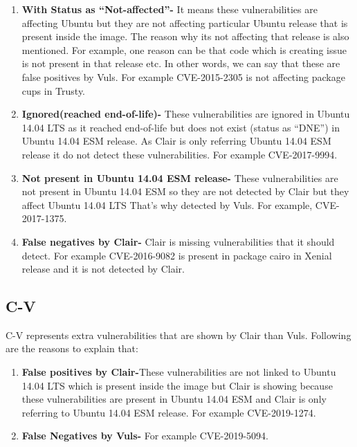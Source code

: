 \documentclass[a4paper,num-refs]{oup-contemporary}
\begin{document}
\begin{enumerate}

\item\textbf{With Status as “Not-affected”-} It means these vulnerabilities are affecting Ubuntu but they are not 
affecting particular Ubuntu release that is present inside the image. The reason why its not affecting 
that release is also mentioned. For example, one reason can be that code which is creating issue is not 
present in that release etc. In other words, we can say that these are false positives by Vuls.
For example CVE-2015-2305 is not affecting package cups in Trusty.

\item\textbf{Ignored(reached end-of-life)-} These vulnerabilities are ignored in Ubuntu 14.04 LTS as it reached end-of-life 
but does not exist (status as “DNE”) in Ubuntu 14.04 ESM release. As Clair is only referring Ubuntu 14.04 ESM 
release it do not detect these vulnerabilities. For example CVE-2017-9994.

\item\textbf{Not present in Ubuntu 14.04 ESM release-} These vulnerabilities are not present in Ubuntu 14.04 ESM so they 
are not detected by Clair but they affect Ubuntu 14.04 LTS That’s why detected by Vuls. For example, CVE-2017-1375.

\item\textbf{False negatives by Clair-} Clair is missing vulnerabilities that it should detect. For example CVE-2016-9082 
is present in package cairo in Xenial release and it is not detected by Clair.
\end{enumerate}

\subsection{C-V}

C-V represents extra vulnerabilities that are shown by Clair than Vuls. Following are the reasons to explain that:

\begin{enumerate}
\item \textbf{False positives by Clair-}These vulnerabilities are not linked to Ubuntu 14.04 LTS which is 
present inside the image but Clair is showing because these vulnerabilities are present in Ubuntu 14.04 ESM and 
Clair is only referring to Ubuntu 14.04 ESM release. For example CVE-2019-1274.
\item\textbf{False Negatives by Vuls-} For example CVE-2019-5094.
\end{enumerate}
\end{document}
